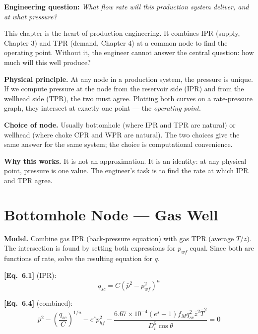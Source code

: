 \documentclass[11pt,a4paper,openany]{book}
\newcommand{\eqrefbook}[1]{\textcolor{blue!60!black}{\textbf{[Eq.~#1]}}}
\begin{document}
\begin{purpose}
\textbf{Engineering question:} \emph{What flow rate will this
production system deliver, and at what pressure?}

This chapter is the heart of production engineering. It combines IPR
(supply, Chapter 3) and TPR (demand, Chapter 4) at a common node to
find the operating point. Without it, the engineer cannot answer the
central question: how much will this well produce?
\end{purpose}

\begin{theory}
\textbf{Physical principle.} At any node in a production system, the
pressure is unique. If we compute pressure at the node from the
reservoir side (IPR) and from the wellhead side (TPR), the two must
agree. Plotting both curves on a rate-pressure graph, they intersect
at exactly one point — the \emph{operating point}.

\textbf{Choice of node.} Usually bottomhole (where IPR and TPR are
natural) or wellhead (where choke CPR and WPR are natural). The two
choices give the same answer for the same system; the choice is
computational convenience.

\textbf{Why this works.} It is not an approximation. It is an
identity: at any physical point, pressure is one value. The engineer's
task is to find the rate at which IPR and TPR agree.
\end{theory}

\section{Bottomhole Node — Gas Well}

\begin{theory}
\textbf{Model.} Combine gas IPR (back-pressure equation) with gas TPR
(average $T$/$z$). The intersection is found by setting both
expressions for $p_{wf}$ equal. Since both are functions of rate,
solve the resulting equation for $q$.
\end{theory}

\eqrefbook{6.1} (IPR):
\begin{equation}
  q_{sc} = C(\bar{p}^2 - p_{wf}^2)^n
\end{equation}

\eqrefbook{6.4} (combined):
\begin{equation}
  \bar{p}^2 - \left(\frac{q_{sc}}{C}\right)^{1/n}
  - e^s p_{hf}^2 - \frac{6.67\times 10^{-4}(e^s - 1)f_M q_{sc}^2\bar{z}^2\bar{T}^2}
  {D_i^5\cos\theta} = 0
\end{equation}
\end{document}
